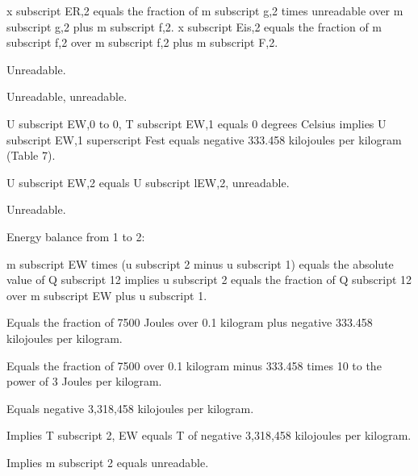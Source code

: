 x subscript ER,2 equals the fraction of m subscript g,2 times unreadable over m subscript g,2 plus m subscript f,2. x subscript Eis,2 equals the fraction of m subscript f,2 over m subscript f,2 plus m subscript F,2.

Unreadable.

Unreadable, unreadable.

U subscript EW,0 to 0, T subscript EW,1 equals 0 degrees Celsius implies U subscript EW,1 superscript Fest equals negative 333.458 kilojoules per kilogram (Table 7).

U subscript EW,2 equals U subscript lEW,2, unreadable.

Unreadable.

Energy balance from 1 to 2:

m subscript EW times (u subscript 2 minus u subscript 1) equals the absolute value of Q subscript 12 implies u subscript 2 equals the fraction of Q subscript 12 over m subscript EW plus u subscript 1.

Equals the fraction of 7500 Joules over 0.1 kilogram plus negative 333.458 kilojoules per kilogram.

Equals the fraction of 7500 over 0.1 kilogram minus 333.458 times 10 to the power of 3 Joules per kilogram.

Equals negative 3,318,458 kilojoules per kilogram.

Implies T subscript 2, EW equals T of negative 3,318,458 kilojoules per kilogram.

Implies m subscript 2 equals unreadable.